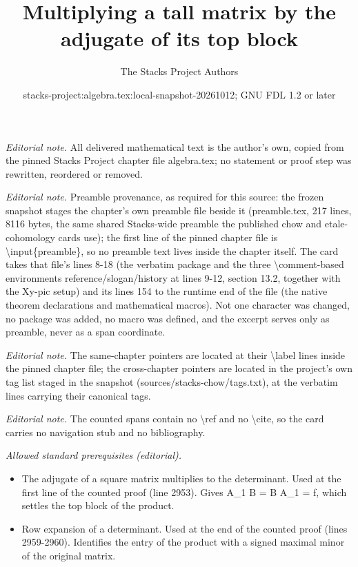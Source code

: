 \documentclass[10pt,a4paper]{amsart}
\title{Multiplying a tall matrix by the adjugate of its top block}
\author{The Stacks Project Authors}
\date{stacks-project:algebra.tex:local-snapshot-20261012; GNU FDL 1.2 or later}
\theoremstyle{plain}
\theoremstyle{definition}
\theoremstyle{remark}
\numberwithin{equation}{subsection}
\begin{document}
\maketitle
\noindent\textit{Editorial note.} All delivered mathematical text is the author's own, copied from the pinned Stacks Project chapter file algebra.tex; no statement or proof step was rewritten, reordered or removed.\par\medskip
\noindent\textit{Editorial note.} Preamble provenance, as required for this source: the frozen snapshot stages the chapter's own preamble file beside it (preamble.tex, 217 lines, 8116 bytes, the same shared Stacks-wide preamble the published chow and etale-cohomology cards use); the first line of the pinned chapter file is \textbackslash{}input\{preamble\}, so no preamble text lives inside the chapter itself. The card takes that file's lines 8-18 (the verbatim package and the three \textbackslash{}comment-based environments reference/slogan/history at lines 9-12, section 13.2, together with the Xy-pic setup) and its lines 154 to the runtime end of the file (the native theorem declarations and mathematical macros). Not one character was changed, no package was added, no macro was defined, and the excerpt serves only as preamble, never as a span coordinate.\par\medskip
\noindent\textit{Editorial note.} The same-chapter pointers are located at their \textbackslash{}label lines inside the pinned chapter file; the cross-chapter pointers are located in the project's own tag list staged in the snapshot (sources/stacks-chow/tags.txt), at the verbatim lines carrying their canonical tags.\par\medskip
\noindent\textit{Editorial note.} The counted spans contain no \textbackslash{}ref and no \textbackslash{}cite, so the card carries no navigation stub and no bibliography.\par\medskip
\noindent\textit{Allowed standard prerequisites (editorial).}\begin{itemize}
\item The adjugate of a square matrix multiplies to the determinant. Used at the first line of the counted proof (line 2953). Gives A\_1 B = B A\_1 = f, which settles the top block of the product.
\item Row expansion of a determinant. Used at the end of the counted proof (lines 2959-2960). Identifies the entry of the product with a signed maximal minor of the original matrix.
\end{itemize}\medskip
\end{document}

